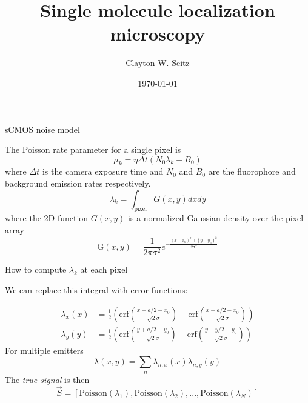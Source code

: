 \documentclass[aspectratio=169]{beamer}
\title{Single molecule localization microscopy}	%
\author{Clayton W. Seitz}								%
\date{\today}									%
\begin{document}
\begin{frame}
  \titlepage
\end{frame}


\begin{frame}{sCMOS noise model}

The Poisson rate parameter for a single pixel is 
\begin{equation*}
\mu_{k} = \eta\Delta t(N_{0}\lambda_{k} + B_{0}) 
\end{equation*}
where $\Delta t$ is the camera exposure time and $N_{0}$ and $B_{0}$ are the fluorophore and background emission rates respectively. 
\begin{equation*}
\lambda_{k} = \int_{\mathrm{pixel}}G(x,y)dxdy
\end{equation*}
where the 2D function $G(x,y)$ is a normalized Gaussian density over the pixel array
\begin{equation*}
\mathrm{G}(x,y) = \frac{1}{2\pi\sigma^{2}}e^{-\frac{(x-x_{0})^{2}+(y-y_{0})^{2}}{2\sigma^{2}}}
\end{equation*}
\end{frame}

\begin{frame}{How to compute $\lambda_{k}$ at each pixel}

We can replace this integral with error functions:

\begin{align*}
\lambda_{x}(x) &= \frac{1}{2}\left(\mathrm{erf}\left(\frac{x+a/2-x_{0}}{\sqrt{2}\sigma}\right) -\mathrm{erf}\left(\frac{x-a/2-x_{0}}{\sqrt{2}\sigma}\right)\right)\\
\lambda_{y}(y) &= \frac{1}{2}\left(\mathrm{erf}\left(\frac{y+a/2-y_{0}}{\sqrt{2}\sigma}\right) -\mathrm{erf}\left(\frac{y-y/2-y_{0}}{\sqrt{2}\sigma}\right)\right)
\end{align*}
For multiple emitters
\begin{equation*}
\lambda(x,y) = \sum_{n}\lambda_{n,x}(x)\lambda_{n,y}(y)
\end{equation*}
The \emph{true signal} is then
\begin{equation*}
\vec{S} = \left[\mathrm{Poisson}(\lambda_{1}), \mathrm{Poisson}(\lambda_{2}), ..., \mathrm{Poisson}(\lambda_{N})\right]
\end{equation*}

\end{frame}
\end{document}
